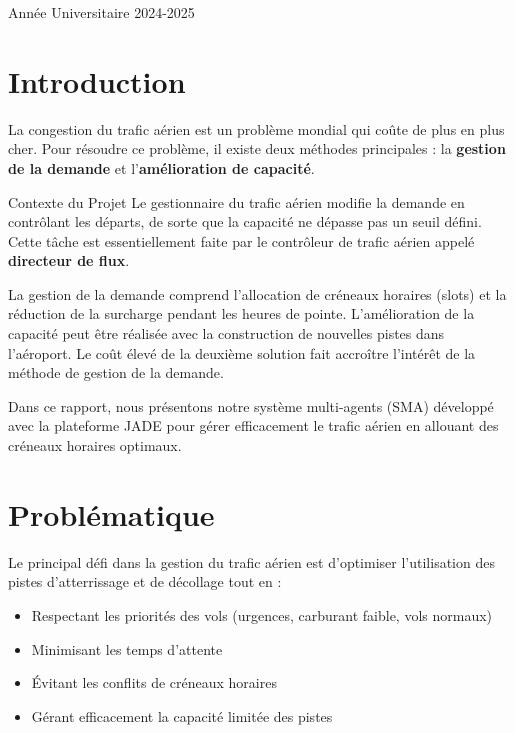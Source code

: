 \documentclass[12pt,a4paper]{article}
\begin{document}
\begin{titlepage}
    \vfill

    {\large\color{darkblue} Année Universitaire 2024-2025\par}
\end{titlepage}

\tableofcontents
\thispagestyle{empty}
\newpage
\setcounter{page}{1}

\section{Introduction}

La congestion du trafic aérien est un problème mondial qui coûte de plus en plus cher. Pour résoudre ce problème, il existe deux méthodes principales : la \textbf{gestion de la demande} et l'\textbf{amélioration de capacité}.

\begin{infobox}{Contexte du Projet}
Le gestionnaire du trafic aérien modifie la demande en contrôlant les départs, de sorte que la capacité ne dépasse pas un seuil défini. Cette tâche est essentiellement faite par le contrôleur de trafic aérien appelé \textbf{directeur de flux}.
\end{infobox}

La gestion de la demande comprend l'allocation de créneaux horaires (slots) et la réduction de la surcharge pendant les heures de pointe. L'amélioration de la capacité peut être réalisée avec la construction de nouvelles pistes dans l'aéroport. Le coût élevé de la deuxième solution fait accroître l'intérêt de la méthode de gestion de la demande.

Dans ce rapport, nous présentons notre système multi-agents (SMA) développé avec la plateforme JADE pour gérer efficacement le trafic aérien en allouant des créneaux horaires optimaux.

\section{Problématique}

Le principal défi dans la gestion du trafic aérien est d'optimiser l'utilisation des pistes d'atterrissage et de décollage tout en :

\begin{itemize}[leftmargin=*]
    \item[\color{primaryblue}$\blacktriangleright$] Respectant les priorités des vols (urgences, carburant faible, vols normaux)
    \item[\color{primaryblue}$\blacktriangleright$] Minimisant les temps d'attente
    \item[\color{primaryblue}$\blacktriangleright$] Évitant les conflits de créneaux horaires
    \item[\color{primaryblue}$\blacktriangleright$] Gérant efficacement la capacité limitée des pistes
\end{itemize}
\end{document}
